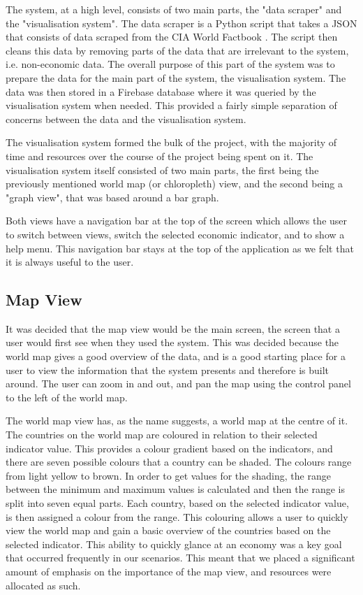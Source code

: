 \documentclass[10pt, journal]{IEEEtran}
\begin{document}
The system, at a high level, consists of two main parts, the "data scraper" and the "visualisation system". The data scraper is a Python script that takes a JSON that consists of data scraped from the CIA World Factbook \cite{cia}. The script then cleans this data by removing parts of the data that are irrelevant to the system, i.e. non-economic data. The overall purpose of this part of the system was to prepare the data for the main part of the system, the visualisation system. The data was then stored in a Firebase \cite{firebase} database where it was queried by the visualisation system when needed. This provided a fairly simple separation of concerns between the data and the visualisation system.

The visualisation system formed the bulk of the project, with the majority of time and resources over the course of the project being spent on it. The visualisation system itself consisted of two main parts, the first being the previously mentioned world map (or chloropleth) view, and the second being a "graph view", that was based around a bar graph. 

Both views have a navigation bar at the top of the screen which allows the user to switch between views, switch the selected economic indicator, and to show a help menu. This navigation bar stays at the top of the application as we felt that it is always useful to the user.

\subsection{Map View}

It was decided that the map view would be the main screen, the screen that a user would first see when they used the system. This was decided because the world map gives a good overview of the data, and is a good starting place for a user to view the information that the system presents and therefore is built around. The user can zoom in and out, and pan the map using the control panel to the left of the world map.

The world map view has, as the name suggests, a world map at the centre of it. The countries on the world map are coloured in relation to their selected indicator value. This provides a colour gradient based on the indicators, and there are seven possible colours that a country can be shaded. The colours range from light yellow to brown. In order to get values for the shading, the range between the minimum and maximum values is calculated and then the range is split into seven equal parts. Each country, based on the selected indicator value, is then assigned a colour from the range. This colouring allows a user to quickly view the world map and gain a basic overview of the countries based on the selected indicator. This ability to quickly glance at an economy was a key goal that occurred frequently in our scenarios. This meant that we placed a significant amount of emphasis on the importance of the map view, and resources were allocated as such.
\end{document}
